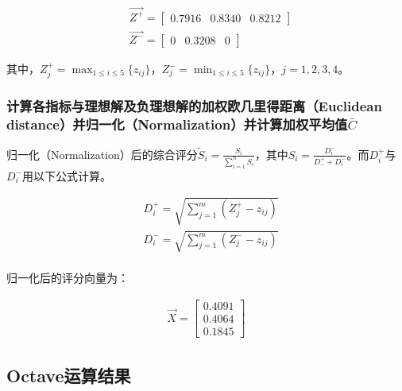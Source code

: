 \documentclass[
  journal=,
  manuscript=,
  year=2022,
  volume=01,
]{cup-journal}
\begin{document}
\begin{equation}
	\begin{aligned}
		& \overrightarrow{Z^{+}}=\begin{bmatrix}
			0.7916 & 0.8340 & 0.8212
		\end{bmatrix}\\
		& \overrightarrow{Z^{-}}=\begin{bmatrix}
			0 & 0.3208 & 0
		\end{bmatrix}
	\end{aligned}
\end{equation}

\par 其中，$Z_{j}^{+}=\max_{1\le i \le 5}\{z_{ij}\}$，$Z_{j}^{-}=\min_{1\le i \le 5}\{z_{ij}\}$，$j=1,2,3,4$。

\subsubsection{计算各指标与理想解及负理想解的加权欧几里得距离（Euclidean distance）并归一化（Normalization）并计算加权平均值$\bar{C}$}

\par 归一化（Normalization）后的综合评分$\tilde{S}_{i}=\frac{S_{i}}{\sum_{i=1}^{n}S_{i}}$，其中$S_{i}=\frac{D^{-}_{i}}{D^{+}_{-}+D^{-}_{i}}$。而$D^{+}_{i}$与$D^{-}_{i}$用以下公式计算。

\begin{equation}
	\begin{aligned}
		& D^{+}_{i} = \sqrt{\sum_{j=1}^{m}(Z^{+}_{j}-z_{ij})} \\
		& D^{-}_{i} = \sqrt{\sum_{j=1}^{m}(Z^{-}_{j}-z_{ij})} \\
	\end{aligned}
\end{equation}

\par 归一化后的评分向量为：

\begin{equation}
	\begin{aligned}
		\overrightarrow{X}=
		\begin{bmatrix}
			0.4091 \\
			0.4064 \\
			0.1845
		\end{bmatrix}
	\end{aligned}
\end{equation}

\subsection{Octave运算结果}
\end{document}
